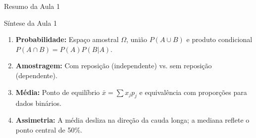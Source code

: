 \documentclass[10pt, aspectratio=169]{beamer}
\begin{document}
\begin{frame}{Resumo da Aula 1}
    \begin{block}{Síntese da Aula 1}
        \begin{enumerate}
            \item \textbf{Probabilidade:} Espaço amostral $\Omega$, união $P(A \cup B)$ e produto condicional $P(A \cap B) = P(A)P(B|A)$.
            \item \textbf{Amostragem:} Com reposição (independente) vs. sem reposição (dependente).
            \item \textbf{Média:} Ponto de equilíbrio $\bar{x} = \sum x_j p_j$ e equivalência com proporções para dados binários.
            \item \textbf{Assimetria:} A média desliza na direção da cauda longa; a mediana reflete o ponto central de 50\%.
        \end{enumerate}
    \end{block}
\end{frame}
\end{document}
